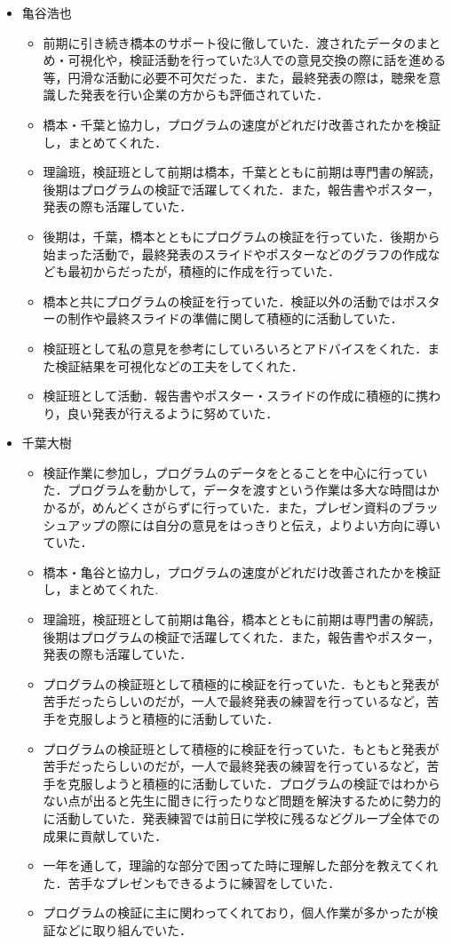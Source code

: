 \documentclass[openany,11pt,papersize]{jsbook}
\begin{document}
\begin{itemize}
\item 亀谷浩也
\begin{itemize}
\item 前期に引き続き橋本のサポート役に徹していた．渡されたデータのまとめ・可視化や，検証活動を行っていた3人での意見交換の際に話を進める等，円滑な活動に必要不可欠だった．また，最終発表の際は，聴衆を意識した発表を行い企業の方からも評価されていた．
\item 橋本・千葉と協力し，プログラムの速度がどれだけ改善されたかを検証し，まとめてくれた．
\item 理論班，検証班として前期は橋本，千葉とともに前期は専門書の解読，後期はプログラムの検証で活躍してくれた．また，報告書やポスター，発表の際も活躍していた．
\item 後期は，千葉，橋本とともにプログラムの検証を行っていた．後期から始まった活動で，最終発表のスライドやポスターなどのグラフの作成なども最初からだったが，積極的に作成を行っていた．
\item 橋本と共にプログラムの検証を行っていた．検証以外の活動ではポスターの制作や最終スライドの準備に関して積極的に活動していた．
\item 検証班として私の意見を参考にしていろいろとアドバイスをくれた．また検証結果を可視化などの工夫をしてくれた．
\item 検証班として活動．報告書やポスター・スライドの作成に積極的に携わり，良い発表が行えるように努めていた．
\end{itemize}

\item 千葉大樹
\begin{itemize}
\item 検証作業に参加し，プログラムのデータをとることを中心に行っていた．プログラムを動かして，データを渡すという作業は多大な時間はかかるが，めんどくさがらずに行っていた．また，プレゼン資料のブラッシュアップの際には自分の意見をはっきりと伝え，よりよい方向に導いていた．
\item 橋本・亀谷と協力し，プログラムの速度がどれだけ改善されたかを検証し，まとめてくれた.
\item 理論班，検証班として前期は亀谷，橋本とともに前期は専門書の解読，後期はプログラムの検証で活躍してくれた．また，報告書やポスター，発表の際も活躍していた．
\item プログラムの検証班として積極的に検証を行っていた．もともと発表が苦手だったらしいのだが，一人で最終発表の練習を行っているなど，苦手を克服しようと積極的に活動していた．
\item プログラムの検証班として積極的に検証を行っていた．もともと発表が苦手だったらしいのだが，一人で最終発表の練習を行っているなど，苦手を克服しようと積極的に活動していた．プログラムの検証ではわからない点が出ると先生に聞きに行ったりなど問題を解決するために勢力的に活動していた．発表練習では前日に学校に残るなどグループ全体での成果に貢献していた．
\item 一年を通して，理論的な部分で困ってた時に理解した部分を教えてくれた．苦手なプレゼンもできるように練習をしていた．
\item プログラムの検証に主に関わってくれており，個人作業が多かったが検証などに取り組んでいた．
\end{itemize}

\end{itemize}

\end{document}
